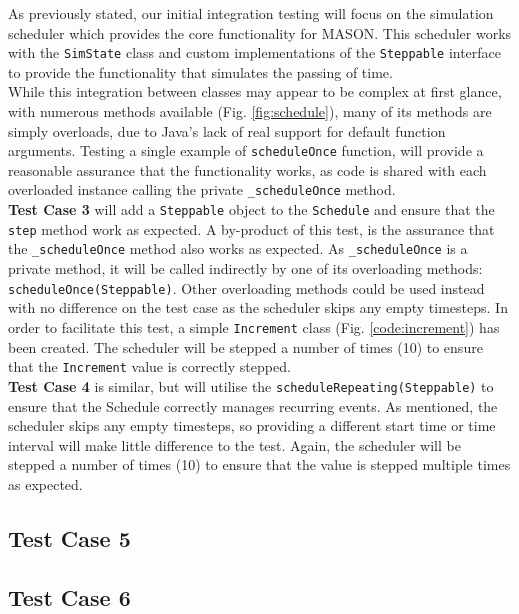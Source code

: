\documentclass[11pt]{article}
\begin{document}
As previously stated, our initial integration testing will focus on the simulation scheduler which provides the core functionality for MASON.
This scheduler works with the \texttt{SimState} class and custom implementations of the \texttt{Steppable} interface to provide the functionality that simulates the passing of time.
\\

While this integration between classes may appear to be complex at first glance, with numerous methods available (Fig. \ref{fig:schedule}), many of its methods are simply overloads,  due to Java's lack of real support for default function arguments.
Testing a single example of \texttt{scheduleOnce} function, will provide a reasonable assurance that the functionality works, as code is shared with each overloaded instance calling the private \texttt{\_scheduleOnce} method.
\\

\textbf{Test Case 3} will add a \texttt{Steppable} object to the \texttt{Schedule} and ensure that the \texttt{step} method work as expected.
A by-product of this test, is the assurance that the \texttt{\_scheduleOnce} method also works as expected.
As \texttt{\_scheduleOnce} is a private method, it will be called indirectly by one of its overloading methods: \texttt{scheduleOnce(Steppable)}.
Other overloading methods could be used instead with no difference on the test case as the scheduler skips any empty timesteps.
In order to facilitate this test, a simple \texttt{Increment} class (Fig. \ref{code:increment}) has been created.
The scheduler will be stepped a number of times (10) to ensure that the \texttt{Increment} value is correctly stepped.
\\

\textbf{Test Case 4} is similar, but will utilise the \texttt{scheduleRepeating(Steppable)} to ensure that the Schedule correctly manages recurring events.
As mentioned, the scheduler skips any empty timesteps, so providing a different start time or time interval will make little difference to the test.
Again, the scheduler will be stepped a number of times (10) to ensure that the value is stepped multiple times as expected.
\\

\subsection{Test Case 5}
\subsection{Test Case 6}
\end{document}
